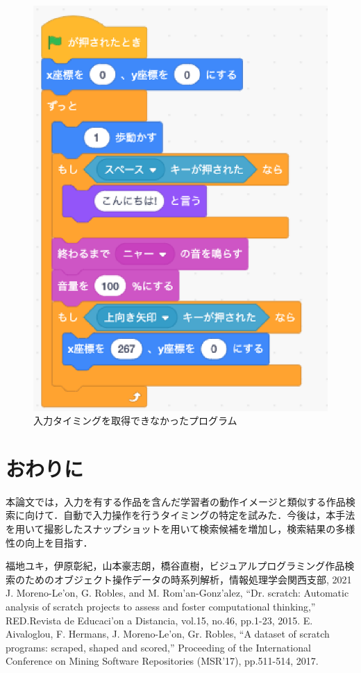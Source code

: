 \documentclass[uplatex,dvipdfmx,a4paper,twocolumn,base=11pt,jbase=11pt,ja=standard]{bxjsarticle}  %
\begin{document}
\begin{figure}
    \begin{center}
        \includegraphics[width=0.5\linewidth]{program.eps}
        \caption{入力タイミングを取得できなかったプログラム}
        \label{fig:input}
    \end{center}
\vspace{-8mm}
\end{figure}

%


\section{おわりに}

本論文では，入力を有する作品を含んだ学習者の動作イメージと類似する作品検索に向けて．自動で入力操作を行うタイミングの特定を試みた．今後は，本手法を用いて撮影したスナップショットを用いて検索候補を増加し，検索結果の多様性の向上を目指す．



\begin{thebibliography}{1}
   福地ユキ，伊原彰紀，山本豪志朗，橋谷直樹，ビジュアルプログラミング作品検索のためのオブジェクト操作データの時系列解析，情報処理学会関西支部, 2021
   J. Moreno-Le'on, G. Robles, and M. Rom'an-Gonz'alez, ``Dr. scratch: Automatic analysis of scratch projects to assess and foster computational thinking,'' RED.Revista de Educaci'on a Distancia, vol.15, no.46, pp.1-23, 2015.
   E. Aivaloglou, F. Hermans, J. Moreno-Le'on, Gr. Robles, ``A dataset of scratch programs: scraped, shaped and scored,'' Proceeding of the International Conference on Mining Software Repositories (MSR'17), pp.511-514, 2017. 

\end{thebibliography}





%
\end{document}
